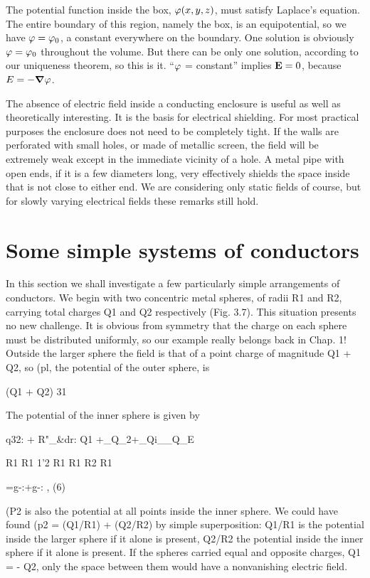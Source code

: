 The potential function inside the box, $\varphi(x,y,z)$, must satisfy
Laplace's equation. The entire boundary of this region, namely the
box, is an equipotential, so we have $\varphi=\varphi_0$, a constant everywhere
on the boundary. One solution is obviously $\varphi=\varphi_0$ throughout
the volume. But there can be only one solution, according to our
uniqueness theorem, so this is it. ``$\varphi$ = constant'' implies $\mathbf{E} = 0$,
because $E = -\boldsymbol{\nabla} \varphi$.

The absence of electric field inside a conducting enclosure is useful
as well as theoretically interesting. It is the basis for electrical
shielding. For most practical purposes the enclosure does not need
to be completely tight. If the walls are perforated with small holes,
or made of metallic screen, the field will be extremely weak except
in the immediate vicinity of a hole. A metal pipe with open ends,
if it is a few diameters long, very effectively shields the space inside
that is not close to either end. We are considering only static fields
of course, but for slowly varying electrical fields these remarks still
hold.

\iffalse

\section{Some simple systems of conductors}

In this section we shall investigate a few particularly simple arrangements
of conductors. We begin with two concentric metal
spheres, of radii R1 and R2, carrying total charges Q1 and Q2 respectively
(Fig. 3.7). This situation presents no new challenge. It is
obvious from symmetry that the charge on each sphere must be distributed
uniformly, so our example really belongs back in Chap. 1!
Outside the larger sphere the field is that of a point charge of magnitude
Q1 + Q2, so (pl, the potential of the outer sphere, is

(Q1 + Q2)
31

The potential of the inner sphere is given by

q32: + R"_&dr: Q1 +_Q_2+_Qi__Q_E

R1 R1 1'2 R1 R1 R2 R1

=g-:+g-: , (6)

(P2 is also the potential at all points inside the inner sphere. We could
have found (p2 = (Q1/R1) + (Q2/R2) by simple superposition:
Q1/R1 is the potential inside the larger sphere if it alone is present,
Q2/R2 the potential inside the inner sphere if it alone is present. If
the spheres carried equal and opposite charges, Q1 = - Q2, only the
space between them would have a nonvanishing electric field.

